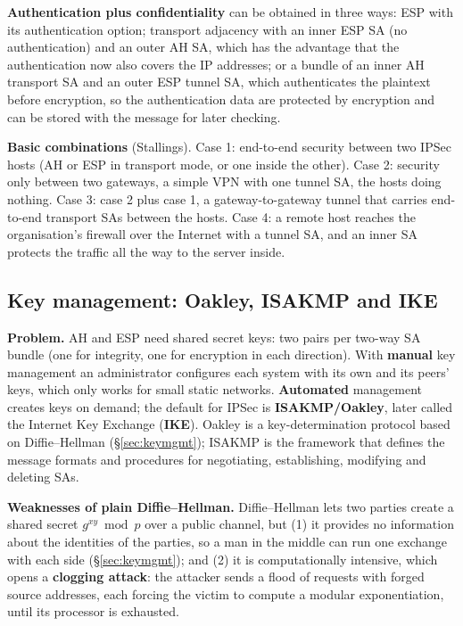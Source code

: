 \textbf{Authentication plus confidentiality} can be obtained in three ways: ESP with its authentication option; transport adjacency with an inner ESP SA (no authentication) and an outer AH SA, which has the advantage that the authentication now also covers the IP addresses; or a bundle of an inner AH transport SA and an outer ESP tunnel SA, which authenticates the plaintext before encryption, so the authentication data are protected by encryption and can be stored with the message for later checking.

\textbf{Basic combinations} (Stallings). Case 1: end-to-end security between two IPSec hosts (AH or ESP in transport mode, or one inside the other). Case 2: security only between two gateways, a simple VPN with one tunnel SA, the hosts doing nothing. Case 3: case 2 plus case 1, a gateway-to-gateway tunnel that carries end-to-end transport SAs between the hosts. Case 4: a remote host reaches the organisation's firewall over the Internet with a tunnel SA, and an inner SA protects the traffic all the way to the server inside.

\subsection{Key management: Oakley, ISAKMP and IKE \hot\new}

\textbf{Problem.} AH and ESP need shared secret keys: two pairs per two-way SA bundle (one for integrity, one for encryption in each direction). With \textbf{manual} key management an administrator configures each system with its own and its peers' keys, which only works for small static networks. \textbf{Automated} management creates keys on demand; the default for IPSec is \textbf{ISAKMP/Oakley}, later called the Internet Key Exchange (\textbf{IKE}). Oakley is a key-determination protocol based on Diffie--Hellman (\S\ref{sec:keymgmt}); ISAKMP is the framework that defines the message formats and procedures for negotiating, establishing, modifying and deleting SAs.

\textbf{Weaknesses of plain Diffie--Hellman.} Diffie--Hellman lets two parties create a shared secret $g^{xy} \bmod p$ over a public channel, but (1) it provides no information about the identities of the parties, so a man in the middle can run one exchange with each side (\S\ref{sec:keymgmt}); and (2) it is computationally intensive, which opens a \textbf{clogging attack}: the attacker sends a flood of requests with forged source addresses, each forcing the victim to compute a modular exponentiation, until its processor is exhausted.

